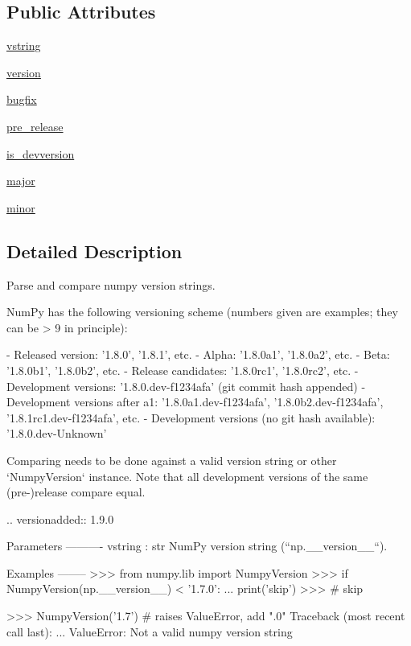 \subsection*{Public Attributes}
\begin{DoxyCompactItemize}
\item 
\hyperlink{classnumpy_1_1lib_1_1__version_1_1NumpyVersion_a042f75c1c65f7a901b91cae401bb61b4}{vstring}
\item 
\hyperlink{classnumpy_1_1lib_1_1__version_1_1NumpyVersion_a05b4ffec77bb94e926578505f5177958}{version}
\item 
\hyperlink{classnumpy_1_1lib_1_1__version_1_1NumpyVersion_a897424190920514c101d41b25fa93e4d}{bugfix}
\item 
\hyperlink{classnumpy_1_1lib_1_1__version_1_1NumpyVersion_a479826630dde458719fe8b9c02193a36}{pre\+\_\+release}
\item 
\hyperlink{classnumpy_1_1lib_1_1__version_1_1NumpyVersion_ac3f3e34217ad17e833339fb5b1377335}{is\+\_\+devversion}
\item 
\hyperlink{classnumpy_1_1lib_1_1__version_1_1NumpyVersion_a284ef8d82bae5490a0285f8e9451b07a}{major}
\item 
\hyperlink{classnumpy_1_1lib_1_1__version_1_1NumpyVersion_a66974a2046d5f5889e9928d1563e7ca0}{minor}
\end{DoxyCompactItemize}


\subsection{Detailed Description}
\begin{DoxyVerb}Parse and compare numpy version strings.

NumPy has the following versioning scheme (numbers given are examples; they
can be > 9 in principle):

- Released version: '1.8.0', '1.8.1', etc.
- Alpha: '1.8.0a1', '1.8.0a2', etc.
- Beta: '1.8.0b1', '1.8.0b2', etc.
- Release candidates: '1.8.0rc1', '1.8.0rc2', etc.
- Development versions: '1.8.0.dev-f1234afa' (git commit hash appended)
- Development versions after a1: '1.8.0a1.dev-f1234afa',
                                 '1.8.0b2.dev-f1234afa',
                                 '1.8.1rc1.dev-f1234afa', etc.
- Development versions (no git hash available): '1.8.0.dev-Unknown'

Comparing needs to be done against a valid version string or other
`NumpyVersion` instance. Note that all development versions of the same
(pre-)release compare equal.

.. versionadded:: 1.9.0

Parameters
----------
vstring : str
    NumPy version string (``np.__version__``).

Examples
--------
>>> from numpy.lib import NumpyVersion
>>> if NumpyVersion(np.__version__) < '1.7.0':
...     print('skip')
>>> # skip

>>> NumpyVersion('1.7')  # raises ValueError, add ".0"
Traceback (most recent call last):
    ...
ValueError: Not a valid numpy version string\end{DoxyVerb}
 

